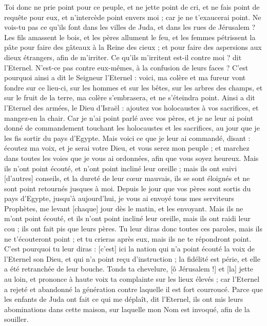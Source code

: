 \begin{multicols}{2}
Toi donc ne prie point pour ce peuple, et ne jette point de cri, et ne fais point de requête pour eux, et n'intercède point envers moi ; car je ne t'exaucerai point.
Ne vois-tu pas ce qu'ils font dans les villes de Juda, et dans les rues de Jérusalem ?
Les fils amassent le bois, et les pères allument le feu, et les femmes pétrissent la pâte pour faire des gâteaux à la Reine des cieux ; et pour faire des aspersions aux dieux étrangers, afin de m'irriter.
Ce qu'ils m'irritent est-il contre moi ? dit l'Eternel. N'est-ce pas contre eux-mêmes, à la confusion de leurs faces ?
C'est pourquoi ainsi a dit le Seigneur l'Eternel : voici, ma colère et ma fureur vont fondre sur ce lieu-ci, sur les hommes et sur les bêtes, sur les arbres des champs, et sur le fruit de la terre, ma colère s'embrasera, et ne s'éteindra point.
Ainsi a dit l'Eternel des armées, le Dieu d'Israël : ajoutez vos holocaustes à vos sacrifices, et mangez-en la chair.
Car je n'ai point parlé avec vos pères, et je ne leur ai point donné de commandement touchant les holocaustes et les sacrifices, au jour que je les fis sortir du pays d'Egypte.
Mais voici ce que je leur ai commandé, disant : écoutez ma voix, et je serai votre Dieu, et vous serez mon peuple ; et marchez dans toutes les voies que je vous ai ordonnées, afin que vous soyez heureux.
Mais ils n'ont point écouté, et n'ont point incliné leur oreille ; mais ils ont suivi [d'autres] conseils, et la dureté de leur cœur mauvais, ils se sont éloignés et ne sont point retournés jusques à moi.
Depuis le jour que vos pères sont sortis du pays d'Egypte, jusqu’à aujourd'hui, je vous ai envoyé tous mes serviteurs Prophètes, me levant [chaque] jour dès le matin, et les envoyant.
Mais ils ne m'ont point écouté, et ils n'ont point incliné leur oreille, mais ils ont raidi leur cou ; ils ont fait pis que leurs pères.
Tu leur diras donc toutes ces paroles, mais ils ne t'écouteront point ; et tu crieras après eux, mais ils ne te répondront point.
C'est pourquoi tu leur diras : [c'est] ici la nation qui n'a point écouté la voix de l'Eternel son Dieu, et qui n'a point reçu d'instruction ; la fidélité est périe, et elle a été retranchée de leur bouche.
Tonds ta chevelure, [ô Jérusalem !] et [la] jette au loin, et prononce à haute voix ta complainte sur les lieux élevés ; car l'Eternel a rejeté et abandonné la génération contre laquelle il est fort courroucé.
Parce que les enfants de Juda ont fait ce qui me déplaît, dit l'Eternel, ils ont mis leurs abominations dans cette maison, sur laquelle mon Nom est invoqué, afin de la souiller.

\end{multicols}
